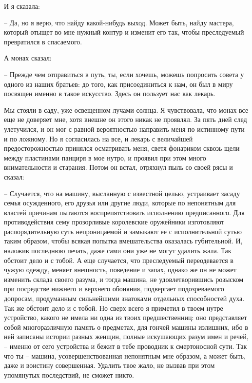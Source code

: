 И я сказала:

-- Да,  но  я  верю,  что  найду  какой-нибудь выход. Может быть, найду
мастера, который отыщет во мне  нужный  контур  и  изменит  его  так,  чтобы
преследуемый превратился в спасаемого.

А монах сказал:

-- Прежде  чем  отправиться  в  путь, ты, если хочешь, можешь попросить
совета у одного из наших братьев: до того, как присоединиться к нам, он  был
в миру посвящен именно в такое искусство. Здесь он пользует нас как лекарь.

Мы стояли в саду, уже освещенном лучами солнца. Я чувствовала, что монах все
еще  не доверяет  мне,  хотя внешне  он  этого никак  не  проявлял. За  пять
дней  след улетучился,  и он  мог с  равной вероятностью  направить меня  по
истинному  пути  и  по  ложному.  Но  я  согласилась  на  все,  и  лекарь  с
величайшей  предосторожностью  принялся  осматривать меня,  светя  фонариком
сквозь щели между  пластинами панциря в мое нутро, и  проявил при этом много
внимательности и  старания. Потом он  встал, отряхнул  пыль со своей  рясы и
сказал:

-- Случается, что на машину, высланную с  известной  целью,  устраивает
засаду  семья осужденного, его друзья или другие люди, которые по непонятным
для властей причинам пытаются  воспрепятствовать  исполнению  предписанного.
Для  противодействия  сему  прозорливые  королевские  оружейники изготовляют
распорядительную суть непроницаемой и замыкают  ее  с  исполнительной  сутью
таким  образом, чтобы всякая попытка вмешательства оказалась губительной. И,
наложив последнюю печать, даже сами они  уже  не  могут  удалить  жала.  Так
обстоит  дело  и  с тобой. А еще случается, что преследуемый переодевается в
чужую одежду, меняет внешность, поведение и запах, однако  же  он  не  может
изменить  склада своего разума, и тогда машина, не удовлетворившись розыском
при  посредстве  нижнего  и  верхнего  обоняния,  подвергает  подозреваемого
допросам, продуманным сильнейшими знатоками отдельных способностей духа. Так
же  обстоит  дело  и  с  тобой.  Но  сверх  всего  я  приметил в твоем нутре
устройство,  какого  не  имела  ни  одна  из   твоих   предшественниц:   оно
представляет  собой  многоразличную  память  о  предметах, для гончей машины
излишних, ибо в ней записаны истории разных женщин, полные искушающих  разум
имен  и  речей,  --  именно  от  сего  устройства и бежит в тебе проводник к
смертоносной сути. Так что ты -- машина, усовершенствованная непонятным  мне
образом,  а  может  быть, даже и воистину совершенная. Удалить твое жало, не
вызвав при этом упомянутых последствий, не сможет никто.

